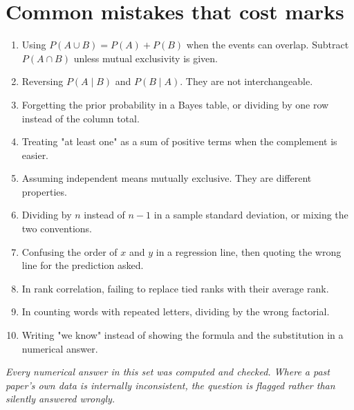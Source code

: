 \documentclass[11pt,a4paper]{article}
\begin{document}
\section{Common mistakes that cost marks}

\begin{enumerate}
\item Using $P(A\cup B)=P(A)+P(B)$ when the events can overlap. Subtract $P(A\cap B)$ unless mutual exclusivity is given.
\item Reversing $P(A\mid B)$ and $P(B\mid A)$. They are not interchangeable.
\item Forgetting the prior probability in a Bayes table, or dividing by one row instead of the column total.
\item Treating "at least one" as a sum of positive terms when the complement is easier.
\item Assuming independent means mutually exclusive. They are different properties.
\item Dividing by $n$ instead of $n-1$ in a sample standard deviation, or mixing the two conventions.
\item Confusing the order of $x$ and $y$ in a regression line, then quoting the wrong line for the prediction asked.
\item In rank correlation, failing to replace tied ranks with their average rank.
\item In counting words with repeated letters, dividing by the wrong factorial.
\item Writing "we know" instead of showing the formula and the substitution in a numerical answer.
\end{enumerate}

\vfill
\begin{center}\textit{Every numerical answer in this set was computed and checked. Where a past paper's own data is internally inconsistent, the question is flagged rather than silently answered wrongly.}\end{center}
\end{document}
